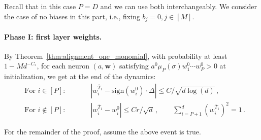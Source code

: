 \documentclass[11pt]{article}
\newcommand{\<}{\langle}
\renewcommand{\>}{\rangle}
\newcommand{\sign}{\text{sign}}
\theoremstyle{definition}
\def\bw{{\boldsymbol w}}
\def\bw{{\boldsymbol w}}
\def\oT{\overline{T}}
\begin{document}
Recall that in this case $P = D$ and we can use both interchangeably. We consider the case of no biases in this part, i.e., fixing $b_j = 0, j \in [M]$.

\paragraph*{Phase I: first layer weights.}

By Theorem~\ref{thm:alignment_one_monomial}, with probability at least $1 - M d^{-C_*}$, for each neuron $(a,\bw)$ satisfying $a^0 \mu_P(\sigma ) w_1^0 \cdots w_P^0 >0$ at initialization, we get at the end of the dynamics:
\begin{align}
&\text{For $i \in [P]$:} \qquad  &&| w_i^{\oT_1} - \sign (w_i^0) \cdot \Delta | \leq C / \sqrt{d\log(d)} \, , \label{eq:first-layer-monomial-1} \\
&\text{For $i \not\in [P]$:} \qquad  &&| w_i^{\oT_1} - w_i^0  | \leq C r / \sqrt{d} \, , \qquad \sum_{i = P+1}^d (w_i^{\oT_1})^2 = 1 \label{eq:first-layer-monomial-2} \, .
\end{align}

For the remainder of the proof, assume the above event is true.
\end{document}
